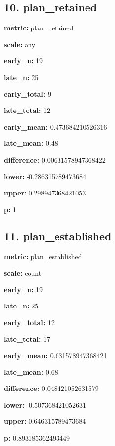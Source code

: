 \documentclass[10pt,a4paper]{article}
\begin{document}
\subsection*{10.\allowbreak{} plan\_\allowbreak{}retained}
\textbf{metric:} plan\_\allowbreak{}retained\par
\textbf{scale:} any\par
\textbf{early\_\allowbreak{}n:} 19\par
\textbf{late\_\allowbreak{}n:} 25\par
\textbf{early\_\allowbreak{}total:} 9\par
\textbf{late\_\allowbreak{}total:} 12\par
\textbf{early\_\allowbreak{}mean:} 0.\allowbreak{}473684210526316\par
\textbf{late\_\allowbreak{}mean:} 0.\allowbreak{}48\par
\textbf{difference:} 0.\allowbreak{}00631578947368422\par
\textbf{lower:} -\allowbreak{}0.\allowbreak{}286315789473684\par
\textbf{upper:} 0.\allowbreak{}298947368421053\par
\textbf{p:} 1\par
\subsection*{11.\allowbreak{} plan\_\allowbreak{}established}
\textbf{metric:} plan\_\allowbreak{}established\par
\textbf{scale:} count\par
\textbf{early\_\allowbreak{}n:} 19\par
\textbf{late\_\allowbreak{}n:} 25\par
\textbf{early\_\allowbreak{}total:} 12\par
\textbf{late\_\allowbreak{}total:} 17\par
\textbf{early\_\allowbreak{}mean:} 0.\allowbreak{}631578947368421\par
\textbf{late\_\allowbreak{}mean:} 0.\allowbreak{}68\par
\textbf{difference:} 0.\allowbreak{}048421052631579\par
\textbf{lower:} -\allowbreak{}0.\allowbreak{}507368421052631\par
\textbf{upper:} 0.\allowbreak{}646315789473684\par
\textbf{p:} 0.\allowbreak{}893185362493449\par
\end{document}
